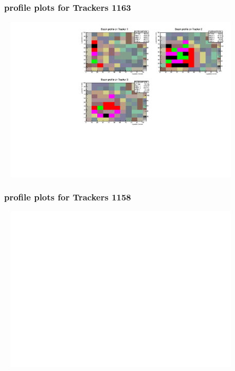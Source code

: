 \documentclass[slidestop,compress,mathserif]{beamer}
\begin{document}
\begin{frame}\frametitle{profile plots for Trackers 1163}
	 \includegraphics[width=12cm,height=8cm]{profile_plots_for_Trackers_1163.pdf}
\end{frame}
\begin{frame}\frametitle{profile plots for Trackers 1158}
	 \includegraphics[width=12cm,height=8cm]{profile_plots_for_Trackers_1158.pdf}
\end{frame}
\end{document}
